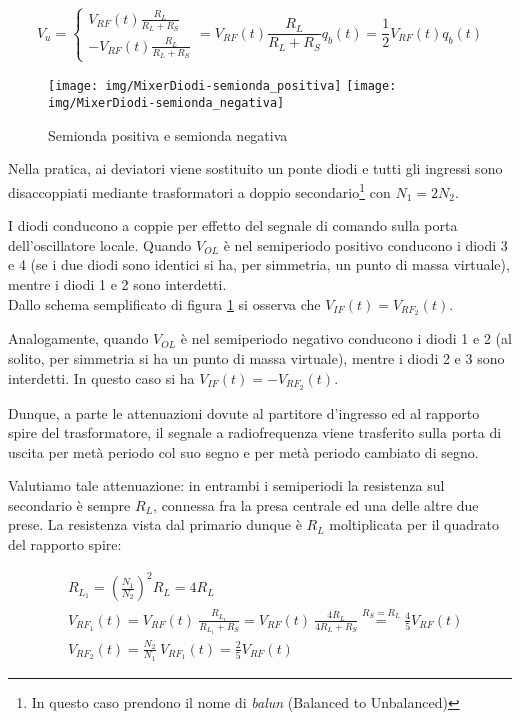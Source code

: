 $$
V_u = \begin{cases}
V_{RF}(t) \frac{R_L}{R_L+R_S}\\
-V_{RF}(t) \frac{R_L}{R_L+R_S}
\end{cases}
=
V_{RF}(t) \frac{R_L}{R_L+R_S} q_b(t) = \frac{1}{2} V_{RF}(t) q_b(t)
$$

\begin{figure}[htb!]
	\hspace{\fill}
	\texttt{[image: img/MixerDiodi-semionda\_positiva]}
	\hspace{\fill}
	\texttt{[image: img/MixerDiodi-semionda\_negativa]}
	\hspace{\fill}
	\caption{Semionda positiva e semionda negativa}
	\label{fig:mixer-diodi-doppiamente-semplificato-variazioni}
\end{figure}

Nella pratica, ai deviatori viene sostituito un ponte diodi e tutti gli ingressi sono disaccoppiati mediante trasformatori a doppio secondario\footnote{In questo caso prendono il nome di \textit{balun} (Balanced to Unbalanced)} con $N_1 = 2N_2$.

I diodi conducono a coppie per effetto del segnale di comando sulla porta dell'oscillatore locale.
Quando $V_{OL}$ è nel semiperiodo positivo conducono i diodi 3 e 4 (se i due diodi sono identici si ha, per simmetria, un punto di massa virtuale), mentre i diodi 1 e 2 sono interdetti.\\
Dallo schema semplificato di figura \ref{fig:mixer-diodi-doppiamente-semplificato-variazioni} si osserva che $V_{IF}(t) = V_{{RF}_2}(t)$.

Analogamente, quando $V_{OL}$ è nel semiperiodo negativo conducono i diodi 1 e 2 (al solito, per simmetria si ha un punto di massa virtuale), mentre i diodi 2 e 3 sono interdetti.
In questo caso si ha $V_{IF}(t) = -V_{{RF}_2}(t)$.

Dunque, a parte le attenuazioni dovute al partitore d'ingresso ed al rapporto spire del trasformatore, il segnale a radiofrequenza viene trasferito sulla porta di uscita per metà periodo col suo segno e per metà periodo cambiato di segno.

Valutiamo tale attenuazione: in entrambi i semiperiodi la resistenza sul secondario è sempre $R_L$, connessa fra la presa centrale ed una delle altre due prese.
La resistenza vista dal primario dunque è $R_L$ moltiplicata per il quadrato del rapporto spire:

\begin{align*}
&R_{L_1} = \left( \frac{N_1}{N_2} \right)^2 R_L =
4 R_L
\\
&V_{{RF}_1}(t) = V_{RF}(t) ~ \frac{R_{L_1}}{R_{L_1} + R_S} = V_{RF}(t) ~ \frac{4 R_L}{4 R_L + R_S} \overset{R_S = R_L}{=}
\frac{4}{5} V_{RF}(t)
\\
&V_{{RF}_2}(t) = \frac{N_2}{N_1} ~ V_{{RF}_1}(t) =
\frac{2}{5} V_{RF}(t)
\end{align*}

